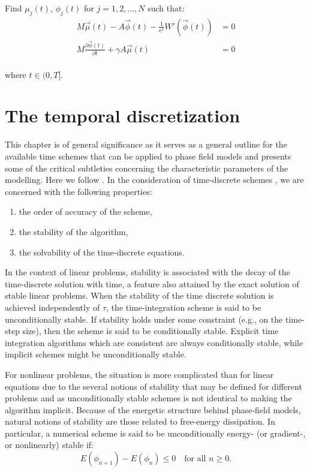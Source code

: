 \documentclass{article}
\begin{document}
Find  $\mu_j(t)$, $\phi_j(t)$ for $j = 1, 2, \ldots, N$ such that:\\

\begin{align}
M\vec{\mu}(t) - A\vec{\phi}(t)- \frac{1}{\epsilon^2}W'(\vec{\phi}(t)) &= 0 \\
M\frac{\partial \vec{\phi}(t)}{\partial t} + \gamma A\vec{\mu}(t) &= 0 
\end{align}\\

where $t \in (0, T].$

\section{The temporal discretization}
This chapter is of general significance as it serves as a general outline for the available time schemes that can be applied to phase field models and presents some of the critical subtleties concerning the characteristic parameters of the modelling. Here we follow \cite{inbook}.
In the consideration of time-discrete schemes , we are concerned with the following properties:
\begin{enumerate}
    \item the order of accuracy of the scheme,
    \item the stability of the algorithm,
    \item the solvability of the time-discrete equations.
\end{enumerate}

In the context of linear problems, stability is associated with the decay of the time-discrete solution with time, a feature also attained by the exact solution of stable linear problems. When the stability of the time discrete solution is achieved independently of $\tau$, the time-integration scheme is said to be unconditionally stable. If stability holds under some constraint (e.g., on the time-step size), then the scheme is said to be conditionally stable. Explicit time integration algorithms which are consistent are always conditionally stable, while implicit schemes might be unconditionally stable.

For nonlinear problems, the situation is more complicated than for linear equations due to the several notions of stability that may be defined for different problems and as unconditionally stable schemes is not identical to making the algorithm implicit. Because of the energetic structure behind phase-field models, natural notions of stability are those related to free-energy dissipation. In particular, a numerical scheme is said to be unconditionally energy- (or gradient-, or nonlinearly) stable if:
\begin{equation}
    E(\phi_{n+1}) - E(\phi_n) \leq 0 \quad \text{for all } n \geq 0. \label{eq:energy_stability}
\end{equation}
\end{document}
